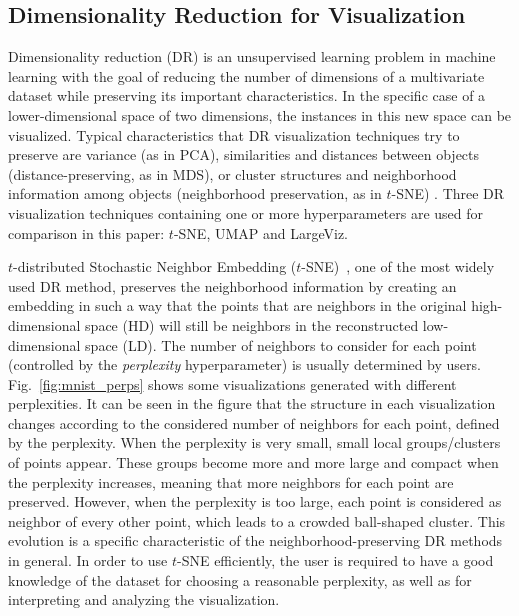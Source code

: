 \subsection{Dimensionality Reduction for Visualization}\label{subsec:background_DR}

Dimensionality reduction (DR) is an unsupervised learning problem in machine learning with the goal of reducing the number of dimensions of a multivariate dataset while preserving its important characteristics. In the specific case of a lower-dimensional space of two dimensions, the instances in this new space can be visualized. Typical characteristics that DR visualization techniques try to preserve are variance (as in PCA), similarities and distances between objects (distance-preserving, as in MDS), or cluster structures and neighborhood information among objects (neighborhood preservation, as in $t$-SNE) \cite{lee2007}. Three DR visualization techniques containing one or more hyperparameters are used for comparison in this paper: $t$-SNE, UMAP and LargeViz.

$t$-distributed Stochastic Neighbor Embedding ($t$-SNE)~\cite{maaten2008tsne}, one of the most widely used DR method, preserves the neighborhood information by creating an embedding in such a way that the points that are neighbors in the original high-dimensional space (HD) will still be neighbors in the reconstructed low-dimensional space (LD). 
The number of neighbors to consider for each point (controlled by the \emph{perplexity} hyperparameter) is usually determined by users.
Fig.~\ref{fig:mnist_perps} shows some visualizations generated with different perplexities. 
It can be seen in the figure that the structure in each visualization changes according to the considered number of neighbors for each point, defined by the perplexity. When the perplexity is very small, small local groups/clusters of points appear. These groups become more and more large and compact when the perplexity increases, meaning that more neighbors for each point are preserved. However, when the perplexity is too large, each point is considered as neighbor of every other point, which leads to a crowded ball-shaped cluster. This evolution is a specific characteristic of the neighborhood-preserving DR methods in general. In order to use $t$-SNE efficiently, the user is required to have a good knowledge of the dataset for choosing a reasonable perplexity, as well as for interpreting and analyzing the visualization.

